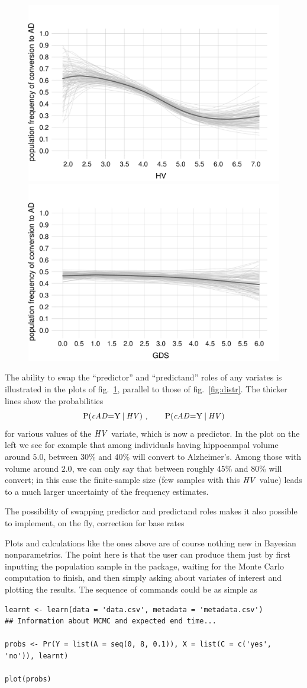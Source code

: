 \medskip

\begin{figure}[t]
\centering%
\includegraphics[width=0.45\linewidth]{figures/prob_conversion_HV.pdf}\hfill%
\includegraphics[width=0.45\linewidth]{figures/prob_conversion_GDS.pdf}%
\\ \caption{}\label{fig:distr_inv}
\end{figure}
The ability to swap the ``predictor'' and ``predictand'' roles of any variates is illustrated in the plots of fig.~\ref{fig:distr_inv}, parallel to those of fig.~\ref{fig:distr}. The thicker lines show the probabilities
\begin{equation*}
    \P( \cAD \mo \yy \| \HV)\ ,\qquad
  \P( \cAD \mo \yy \| \HV)
\end{equation*}
for various values of the $\mathit{HV}$ variate, which is now a predictor.
In the plot on the left we see for example that among individuals having hippocampal volume around $5.0$, between 30\% and 40\% will convert to Alzheimer's. Among those with volume around $2.0$, we can only say that between roughly 45\% and 80\% will convert; in this case the finite-sample size (few samples with this $\mathit{HV}$ value) leads to a much larger uncertainty of the frequency estimates.

The possibility of swapping predictor and predictand roles makes it also possible to implement, on the fly, correction for base rates \citep[\S\,4]{lindleyetal1981}

\medskip

Plots and calculations like the ones above are of course nothing new in Bayesian nonparametrics. The point here is that the user can produce them just by first inputting the population sample in the package, waiting for the Monte Carlo computation to finish, and then simply asking about variates of interest and plotting the results. The sequence of commands could be as simple as
\begin{verbatim}
learnt <- learn(data = 'data.csv', metadata = 'metadata.csv')
## Information about MCMC and expected end time...

probs <- Pr(Y = list(A = seq(0, 8, 0.1)), X = list(C = c('yes', 'no')), learnt)

plot(probs)
\end{verbatim}

